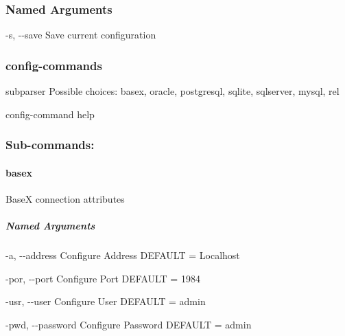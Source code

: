 \documentclass[letterpaper,10pt,english,openany,oneside]{sphinxmanual}
\begin{document}
\subsubsection{Named Arguments}
\label{\detokenize{cmd_main:Named Arguments_repeat10}}\begin{optionlist}{3cm}
\item [-s, -{-}save]  
Save current configuration
\end{optionlist}


\subsubsection{config-commands}
\label{\detokenize{cmd_main:config-commands}}\begin{optionlist}{3cm}
\item [subparser]  
Possible choices: basex, oracle, postgresql, sqlite, sqlserver, mysql, rel

config-command help
\end{optionlist}


\subsubsection{Sub-commands:}
\label{\detokenize{cmd_main:Sub-commands:_repeat1}}

\paragraph{basex}
\label{\detokenize{cmd_main:basex}}
BaseX connection attributes

\begin{sphinxVerbatim}[commandchars=\\\{\}]
   \PYG{p}{[}\PYG{p}{]} \PYG{p}{[} \PYG{p}{]} \PYG{p}{[} \PYG{p}{]} \PYG{p}{[} \PYG{p}{]} \PYG{p}{[} \PYG{p}{]}
\end{sphinxVerbatim}


\subparagraph{Named Arguments}
\label{\detokenize{cmd_main:Named Arguments_repeat11}}\begin{optionlist}{3cm}
\item [-a, -{-}address]  
Configure Address DEFAULT = Localhost
\item [-por, -{-}port]  
Configure Port DEFAULT = 1984
\item [-usr, -{-}user]  
Configure User DEFAULT = admin
\item [-pwd, -{-}password]  
Configure Password DEFAULT = admin
\end{optionlist}
\end{document}
